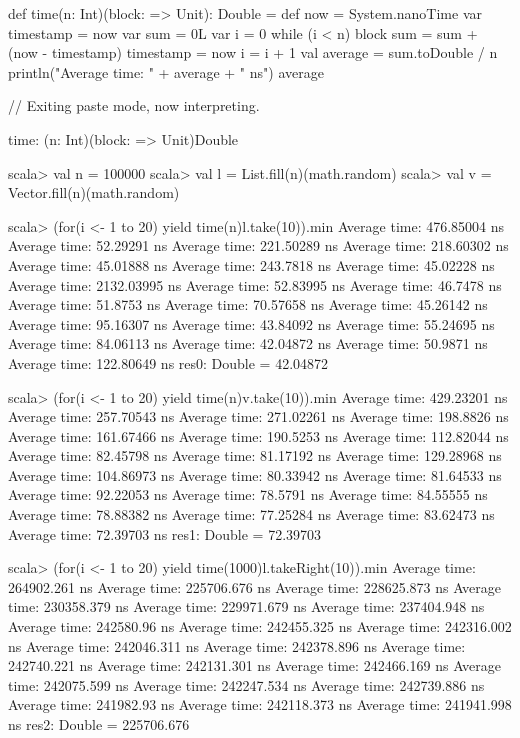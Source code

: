 {{\begin{REPLnonum}
def time(n: Int)(block: => Unit): Double =  {
  def now = System.nanoTime
  var timestamp = now
  var sum = 0L
  var i = 0
  while (i < n) {
    block
    sum = sum + (now - timestamp)
    timestamp = now
    i = i + 1
  }
  val average = sum.toDouble / n
  println("Average time: " + average + " ns")
  average
}

// Exiting paste mode, now interpreting.

time: (n: Int)(block: => Unit)Double

scala> val n = 100000
scala> val l = List.fill(n)(math.random)
scala> val v = Vector.fill(n)(math.random)

scala> (for(i <- 1 to 20) yield time(n){l.take(10)}).min
Average time: 476.85004 ns
Average time: 52.29291 ns
Average time: 221.50289 ns
Average time: 218.60302 ns
Average time: 45.01888 ns
Average time: 243.7818 ns
Average time: 45.02228 ns
Average time: 2132.03995 ns
Average time: 52.83995 ns
Average time: 46.7478 ns
Average time: 51.8753 ns
Average time: 70.57658 ns
Average time: 45.26142 ns
Average time: 95.16307 ns
Average time: 43.84092 ns
Average time: 55.24695 ns
Average time: 84.06113 ns
Average time: 42.04872 ns
Average time: 50.9871 ns
Average time: 122.80649 ns
res0: Double = 42.04872


scala> (for(i <- 1 to 20) yield time(n){v.take(10)}).min
Average time: 429.23201 ns
Average time: 257.70543 ns
Average time: 271.02261 ns
Average time: 198.8826 ns
Average time: 161.67466 ns
Average time: 190.5253 ns
Average time: 112.82044 ns
Average time: 82.45798 ns
Average time: 81.17192 ns
Average time: 129.28968 ns
Average time: 104.86973 ns
Average time: 80.33942 ns
Average time: 81.64533 ns
Average time: 92.22053 ns
Average time: 78.5791 ns
Average time: 84.55555 ns
Average time: 78.88382 ns
Average time: 77.25284 ns
Average time: 83.62473 ns
Average time: 72.39703 ns
res1: Double = 72.39703

scala> (for(i <- 1 to 20) yield time(1000){l.takeRight(10)}).min
Average time: 264902.261 ns
Average time: 225706.676 ns
Average time: 228625.873 ns
Average time: 230358.379 ns
Average time: 229971.679 ns
Average time: 237404.948 ns
Average time: 242580.96 ns
Average time: 242455.325 ns
Average time: 242316.002 ns
Average time: 242046.311 ns
Average time: 242378.896 ns
Average time: 242740.221 ns
Average time: 242131.301 ns
Average time: 242466.169 ns
Average time: 242075.599 ns
Average time: 242247.534 ns
Average time: 242739.886 ns
Average time: 241982.93 ns
Average time: 242118.373 ns
Average time: 241941.998 ns
res2: Double = 225706.676


\end{REPLnonum}}}
